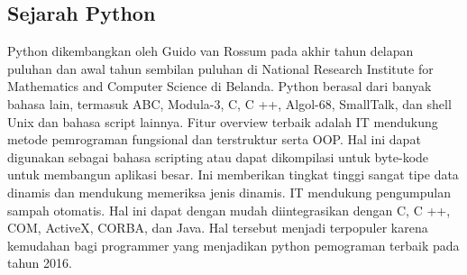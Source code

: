 \subsection{Sejarah Python}
Python dikembangkan oleh Guido van Rossum pada akhir tahun delapan puluhan dan awal tahun sembilan puluhan di National Research Institute for Mathematics and Computer Science di Belanda. Python berasal dari banyak bahasa lain, termasuk ABC, Modula-3, C, C ++, Algol-68, SmallTalk, dan shell Unix dan bahasa script lainnya.
Fitur overview terbaik adalah IT mendukung metode pemrograman fungsional dan terstruktur serta OOP. Hal ini dapat digunakan sebagai bahasa scripting atau dapat dikompilasi untuk byte-kode untuk membangun aplikasi besar. Ini memberikan tingkat tinggi sangat tipe data dinamis dan mendukung memeriksa jenis dinamis. IT mendukung pengumpulan sampah otomatis. Hal ini dapat dengan mudah diintegrasikan dengan C, C ++, COM, ActiveX, CORBA, dan Java. Hal tersebut menjadi terpopuler karena kemudahan bagi programmer yang menjadikan python pemograman terbaik pada tahun 2016.

